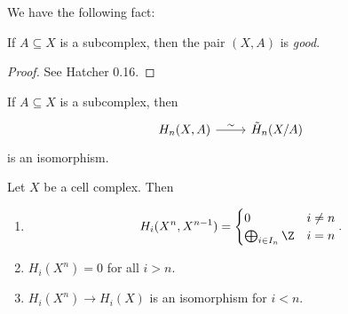\documentclass[a4paper]{article}
\begin{document}
We have the following fact:
\begin{lemma}
  If $A \subseteq X$ is a subcomplex, then the pair $(X, A)$ is \emph{good}.
\end{lemma}

\begin{proof}
  See Hatcher 0.16.
\end{proof}

\begin{cor}
  If $A \subseteq X$ is a subcomplex, then
  \[
    \begin{tikzcd}
      H_n(X, A) \ar[r, "\sim"] & \tilde{H}_n(X/A)
    \end{tikzcd}
  \]
  is an isomorphism.
\end{cor}

\begin{lemma}
  Let $X$ be a cell complex. Then
  \begin{enumerate}
    \item
      \[
        H_i(X^n, X^{n - 1}) =
        \begin{cases}
          0 & i \not= n\\
          \bigoplus_{i \in I_n} \Z & i = n
        \end{cases}.
      \]
    \item $H_i(X^n) = 0$ for all $i > n$.
    \item $H_i(X^n) \to H_i(X)$ is an isomorphism for $i < n$.
  \end{enumerate}
\end{lemma}
\end{document}
